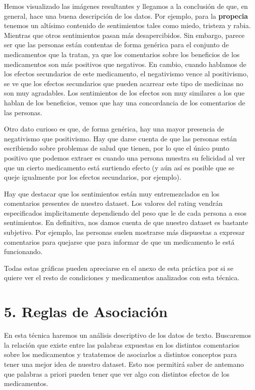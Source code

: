 \documentclass[spanish,]{article}
\begin{document}
Hemos visualizado las imágenes resultantes y llegamos a la conclusión de
que, en general, hace una buena descripción de los datos. Por ejemplo,
para la \textbf{propecia} tenemos un altísimo contenido de sentimientos
tales como miedo, tristeza y rabia. Mientras que otros sentimientos
pasan más desapercibidos. Sin embargo, parece ser que las personas están
contentas de forma genérica para el conjunto de medicamentos que la
tratan, ya que los comentarios sobre los beneficios de los medicamentos
son más positivos que negativos. En cambio, cuando hablamos de los
efectos secundarios de este medicamento, el negativismo vence al
positivismo, se ve que los efectos secundarios que pueden acarrear este
tipo de medicinas no son muy agradables. Los sentimientos de los efectos
son muy similares a los que hablan de los beneficios, vemos que hay una
concordancia de los comentarios de las personas.

Otro dato curioso es que, de forma genérica, hay una mayor presencia de
negativismo que positivismo. Hay que darse cuenta de que las personas
están escribiendo sobre problemas de salud que tienen, por lo que el
único punto positivo que podemos extraer es cuando una persona muestra
su felicidad al ver que un cierto medicamento está surtiendo efecto (y
aún así es posible que se queje igualmente por los efectos secundarios,
por ejemplo).

Hay que destacar que los sentimientos están muy entremezclados en los
comentarios presentes de nuestro dataset. Los valores del rating vendrán
especificados implicitamente dependiendo del peso que le de cada persona
a esos sentimientos. En definitiva, nos damos cuenta de que nuestro
dataset es bastante subjetivo. Por ejemplo, las personas suelen
mostrarse más dispuestas a expresar comentarios para quejarse que para
informar de que un medicamento le está funcionando.

Todas estas gráficas pueden apreciarse en el anexo de esta práctica por
si se quiere ver el resto de condiciones y medicamentos analizados con
esta técnica.

\newpage

\section{5. Reglas de Asociación}\label{reglas-de-asociacion}

En esta técnica haremos un análisis descriptivo de los datos de texto.
Buscaremos la relación que existe entre las palabras expuestas en los
distintos comentarios sobre los medicamentos y tratatemos de asociarlos
a distintos conceptos para tener una mejor idea de nuestro dataset. Esto
nos permitirá saber de antemano que palabras a priori pueden tener que
ver algo con distintos efectos de los medicamentos.
\end{document}
